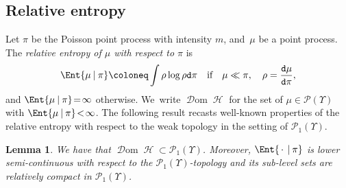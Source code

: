 \documentclass[10pt]{amsart}
\newtheorem{lemma}[theorem]{Lemma}
\theoremstyle{definition}
\theoremstyle{remark}
\newcommand{\given}[1][]{%
\nonscript\:#1\vert
\allowbreak
\nonscript\:
\mathopen{}}
\DeclareMathOperator{\ent}{\mathcal{H}}
\DeclareMathOperator{\dom}{\mathscr{D}om}
\newcommand{\emparg}{\,\cdot\,}
\begin{document}
\subsection{Relative entropy}
Let $\pi$ be the Poisson point process with intensity $m$, and~$\mu$ be a point process.
The \emph{relative entropy of $\mu$ with respect to $\pi$} is
\begin{equation*}
\Ent{\mu \given \pi} \coloneq \int \rho \log \rho \mathtt{d} \pi \quad \text{if} \quad \mu\ll \pi , \quad \rho= \frac{\mathtt{d} \mu}{\mathtt{d} \pi},
\end{equation*}
and $\Ent{\mu \given \pi} \!=\! \infty$ otherwise. We~write $\dom \ent$ for the set of $\mu \!\in\! \mathscr{P}(\varUpsilon)$ with $\Ent{\mu \given \pi} \!<\! \infty$.
The following result recasts well-known properties of the relative entropy with respect to the weak topology in the setting of $\mathscr{P}_{1}(\varUpsilon)$.
\begin{lemma}\label{t:lsc-H}
We have that $\dom \ent \subset \mathscr{P}_{1}(\varUpsilon)$.
Moreover, $\Ent{\emparg \given \pi}$ is lower semi-continuous with respect to the $\mathscr{P}_{1}(\varUpsilon)$-topology and its sub-level sets are relatively compact in $\mathscr{P}_{1}(\varUpsilon)$.
\end{lemma}
\end{document}
